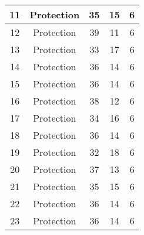 \documentclass[results.tex]{subfiles}
\begin{document}
\begin{center}
\begin{tabular}{| c || c | c | c | c |}
            \hline
            11                      & Protection                   & 35                     & 15                      & 6                    \\
            \hline
            12                      & Protection                   & 39                     & 11                      & 6                    \\
            \hline
            13                      & Protection                   & 33                     & 17                      & 6                    \\
            \hline
            14                      & Protection                   & 36                     & 14                      & 6                    \\
            \hline
            15                      & Protection                   & 36                     & 14                      & 6                    \\
            \hline
            16                      & Protection                   & 38                     & 12                      & 6                    \\
            \hline
            17                      & Protection                   & 34                     & 16                      & 6                    \\
            \hline
            18                      & Protection                   & 36                     & 14                      & 6                    \\
            \hline
            19                      & Protection                   & 32                     & 18                      & 6                    \\
            \hline
            20                      & Protection                   & 37                     & 13                      & 6                    \\
            \hline
            21                      & Protection                   & 35                     & 15                      & 6                    \\
            \hline
            22                      & Protection                   & 36                     & 14                      & 6                    \\
            \hline
            23                      & Protection                   & 36                     & 14                      & 6                    \\

\end{tabular}
\end{center}
\end{document}
